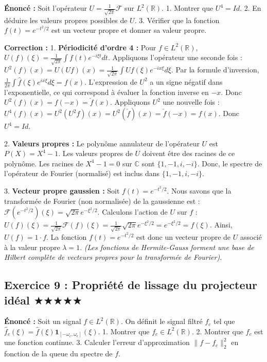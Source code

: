 \documentclass[11pt,a4paper]{article}
\begin{document}
\textbf{Énoncé :}
Soit l'opérateur $U = \frac{1}{\sqrt{2\pi}} \mathcal{F}$ sur $L^2(\mathbb{R})$.
1. Montrer que $U^4 = Id$.
2. En déduire les valeurs propres possibles de $U$.
3. Vérifier que la fonction $f(t) = e^{-t^2/2}$ est un vecteur propre et donner sa valeur propre.

\textbf{Correction :}
1. \textbf{Périodicité d'ordre 4 :}
Pour $f \in L^2(\mathbb{R})$, $U(f)(\xi) = \frac{1}{\sqrt{2\pi}} \int f(t) e^{-i\xi t} dt$.
Appliquons l'opérateur une seconde fois : $U^2(f)(x) = U(Uf)(x) = \frac{1}{\sqrt{2\pi}} \int Uf(\xi) e^{-ix\xi} d\xi$.
Par la formule d'inversion, $\frac{1}{2\pi} \int \hat{f}(\xi) e^{i x \xi} d\xi = f(x)$.
L'expression de $U^2$ a un signe négatif dans l'exponentielle, ce qui correspond à évaluer la fonction inverse en $-x$.
Donc $U^2(f)(x) = f(-x) = \check{f}(x)$.
Appliquons $U^2$ une nouvelle fois :
$U^4(f)(x) = U^2(U^2 f)(x) = U^2(\check{f})(x) = \check{f}(-x) = f(x)$.
Donc $U^4 = Id$.

2. \textbf{Valeurs propres :}
Le polynôme annulateur de l'opérateur $U$ est $P(X) = X^4 - 1$.
Les valeurs propres de $U$ doivent être des racines de ce polynôme.
Les racines de $X^4 - 1 = 0$ sur $\mathbb{C}$ sont $\{1, -1, i, -i\}$.
Donc, le spectre de l'opérateur de Fourier (normalisé) est inclus dans $\{1, -1, i, -i\}$.

3. \textbf{Vecteur propre gaussien :}
Soit $f(t) = e^{-t^2/2}$.
Nous savons que la transformée de Fourier (non normalisée) de la gaussienne est :
$\mathcal{F}(e^{-t^2/2})(\xi) = \sqrt{2\pi} e^{-\xi^2/2}$.
Calculons l'action de $U$ sur $f$ :
$U(f)(\xi) = \frac{1}{\sqrt{2\pi}} \mathcal{F}(f)(\xi) = \frac{1}{\sqrt{2\pi}} \sqrt{2\pi} e^{-\xi^2/2} = e^{-\xi^2/2} = f(\xi)$.
Ainsi, $U(f) = 1 \cdot f$.
La fonction $f(t) = e^{-t^2/2}$ est donc un vecteur propre de $U$ associé à la valeur propre $\lambda = 1$.
\textit{(Les fonctions de Hermite-Gauss forment une base de Hilbert complète de vecteurs propres pour la transformée de Fourier).}



\subsection*{Exercice 9 : Propriété de lissage du projecteur idéal \quad $\bigstar\bigstar\bigstar\bigstar\bigstar$}

\textbf{Énoncé :}
Soit un signal $f \in L^2(\mathbb{R})$. On définit le signal filtré $f_c$ tel que $\hat{f}_c(\xi) = \hat{f}(\xi) \mathbf{1}_{[-\omega_c, \omega_c]}(\xi)$.
1. Montrer que $f_c \in L^2(\mathbb{R})$.
2. Montrer que $f_c$ est une fonction continue.
3. Calculer l'erreur d'approximation $\|f - f_c\|_2^2$ en fonction de la queue du spectre de $f$.
\end{document}
